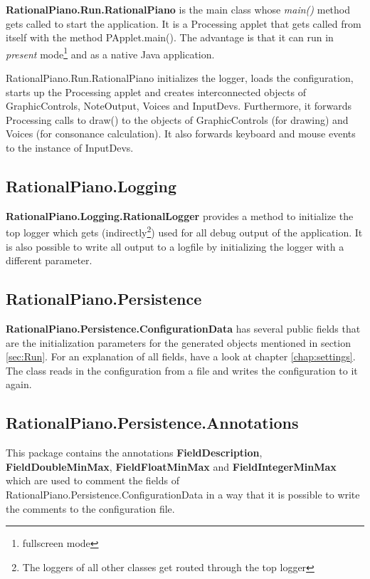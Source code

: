 \documentclass[12pt,a4paper,titlepage,oneside]{report}
\begin{document}
\textbf{RationalPiano.Run.RationalPiano} is the main class whose \textit{main()} method gets called to start the application. It is a Processing applet that gets called from itself with the method PApplet.main(). The advantage is that it can run in \textit{present} mode\footnote{fullscreen mode} and as a native Java application.

RationalPiano.Run.RationalPiano initializes the logger, loads the configuration, starts up the Processing applet and creates interconnected objects of GraphicControls, NoteOutput, Voices and InputDevs. Furthermore, it forwards Processing calls to draw() to the objects of GraphicControls (for drawing) and Voices (for consonance calculation). It also forwards keyboard and mouse events to the instance of InputDevs.


\subsection{RationalPiano.Logging}

\textbf{RationalPiano.Logging.RationalLogger} provides a method to initialize the top logger which gets (indirectly\footnote{The loggers of all other classes get routed through the top logger}) used for all debug output of the application. It is also possible to write all output to a logfile by initializing the logger with a different parameter.


\subsection{RationalPiano.Persistence}

\textbf{RationalPiano.Persistence.ConfigurationData} has several public fields that are the initialization parameters for the generated objects mentioned in section \ref{sec:Run}. For an explanation of all fields, have a look at chapter \ref{chap:settings}. The class reads in the configuration from a file and writes the configuration to it again.


\subsection{RationalPiano.Persistence.Annotations}

This package contains the annotations \textbf{FieldDescription}, \textbf{FieldDoubleMinMax}, \textbf{FieldFloatMinMax} and \textbf{FieldIntegerMinMax} which are used to comment the fields of RationalPiano.Persistence.ConfigurationData in a way that it is possible to write the comments to the configuration file.
\end{document}
